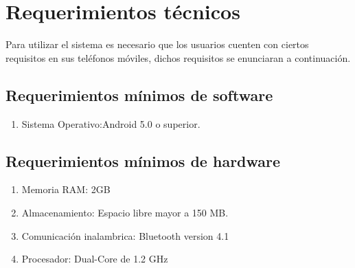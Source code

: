 \section{Requerimientos técnicos}
Para utilizar el sistema es necesario que los usuarios cuenten con ciertos requisitos en sus teléfonos móviles, dichos requisitos se enunciaran a continuación.
\subsection{Requerimientos mínimos de software}
\begin{enumerate}
	\item Sistema Operativo:Android 5.0 o superior.
\end{enumerate}
\subsection{Requerimientos mínimos de hardware}
\begin{enumerate}
	\item Memoria RAM: 2GB
	\item Almacenamiento: Espacio libre mayor a 150 MB.
	\item Comunicación inalambrica: Bluetooth version 4.1
	\item Procesador: Dual-Core de 1.2 GHz
\end{enumerate}